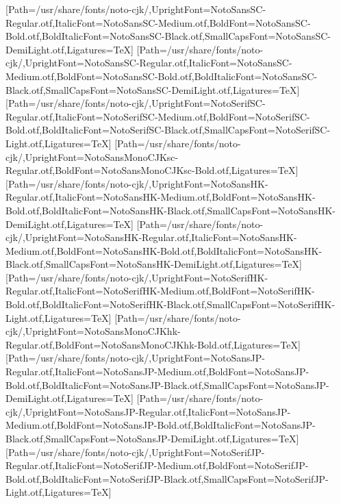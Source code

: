 \newfontfamily{}[Path=/usr/share/fonts/noto-cjk/,UprightFont=NotoSansSC-Regular.otf,ItalicFont=NotoSansSC-Medium.otf,BoldFont=NotoSansSC-Bold.otf,BoldItalicFont=NotoSansSC-Black.otf,SmallCapsFont=NotoSansSC-DemiLight.otf,Ligatures=TeX]
\newfontfamily{}[Path=/usr/share/fonts/noto-cjk/,UprightFont=NotoSansSC-Regular.otf,ItalicFont=NotoSansSC-Medium.otf,BoldFont=NotoSansSC-Bold.otf,BoldItalicFont=NotoSansSC-Black.otf,SmallCapsFont=NotoSansSC-DemiLight.otf,Ligatures=TeX]
\newfontfamily{}[Path=/usr/share/fonts/noto-cjk/,UprightFont=NotoSerifSC-Regular.otf,ItalicFont=NotoSerifSC-Medium.otf,BoldFont=NotoSerifSC-Bold.otf,BoldItalicFont=NotoSerifSC-Black.otf,SmallCapsFont=NotoSerifSC-Light.otf,Ligatures=TeX]
\newfontfamily{}[Path=/usr/share/fonts/noto-cjk/,UprightFont=NotoSansMonoCJKsc-Regular.otf,BoldFont=NotoSansMonoCJKsc-Bold.otf,Ligatures=TeX]
\newfontfamily{}[Path=/usr/share/fonts/noto-cjk/,UprightFont=NotoSansHK-Regular.otf,ItalicFont=NotoSansHK-Medium.otf,BoldFont=NotoSansHK-Bold.otf,BoldItalicFont=NotoSansHK-Black.otf,SmallCapsFont=NotoSansHK-DemiLight.otf,Ligatures=TeX]
\newfontfamily{}[Path=/usr/share/fonts/noto-cjk/,UprightFont=NotoSansHK-Regular.otf,ItalicFont=NotoSansHK-Medium.otf,BoldFont=NotoSansHK-Bold.otf,BoldItalicFont=NotoSansHK-Black.otf,SmallCapsFont=NotoSansHK-DemiLight.otf,Ligatures=TeX]
\newfontfamily{}[Path=/usr/share/fonts/noto-cjk/,UprightFont=NotoSerifHK-Regular.otf,ItalicFont=NotoSerifHK-Medium.otf,BoldFont=NotoSerifHK-Bold.otf,BoldItalicFont=NotoSerifHK-Black.otf,SmallCapsFont=NotoSerifHK-Light.otf,Ligatures=TeX]
\newfontfamily{}[Path=/usr/share/fonts/noto-cjk/,UprightFont=NotoSansMonoCJKhk-Regular.otf,BoldFont=NotoSansMonoCJKhk-Bold.otf,Ligatures=TeX]
\newfontfamily{}[Path=/usr/share/fonts/noto-cjk/,UprightFont=NotoSansJP-Regular.otf,ItalicFont=NotoSansJP-Medium.otf,BoldFont=NotoSansJP-Bold.otf,BoldItalicFont=NotoSansJP-Black.otf,SmallCapsFont=NotoSansJP-DemiLight.otf,Ligatures=TeX]
\newfontfamily{}[Path=/usr/share/fonts/noto-cjk/,UprightFont=NotoSansJP-Regular.otf,ItalicFont=NotoSansJP-Medium.otf,BoldFont=NotoSansJP-Bold.otf,BoldItalicFont=NotoSansJP-Black.otf,SmallCapsFont=NotoSansJP-DemiLight.otf,Ligatures=TeX]
\newfontfamily{}[Path=/usr/share/fonts/noto-cjk/,UprightFont=NotoSerifJP-Regular.otf,ItalicFont=NotoSerifJP-Medium.otf,BoldFont=NotoSerifJP-Bold.otf,BoldItalicFont=NotoSerifJP-Black.otf,SmallCapsFont=NotoSerifJP-Light.otf,Ligatures=TeX]
